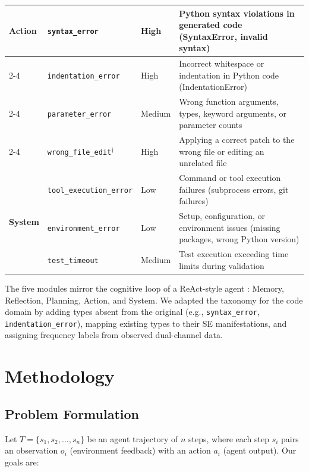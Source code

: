 \documentclass{ieeeaccess}
\begin{document}
\begin{table}[ht!]
\begin{tabularx}{\textwidth}{|p{}|p{}|p{}|X|}
\multirow{4}{*}{\textbf{Action}}
    & \texttt{syntax\_error}               & High & Python syntax violations in generated code (SyntaxError, invalid syntax) \\
\cline{2-4}
    & \texttt{indentation\_\allowbreak{}error}          & High & Incorrect whitespace or indentation in Python code (IndentationError) \\
\cline{2-4}
    & \texttt{parameter\_error}            & Medium & Wrong function arguments, types, keyword arguments, or parameter counts \\
\cline{2-4}
    & \texttt{wrong\_file\_edit}$^\dagger$ & High & Applying a correct patch to the wrong file or editing an unrelated file \\
\hline

\multirow{3}{*}{\textbf{System}}
    & \texttt{tool\_execution\_\allowbreak{}error}      & Low    & Command or tool execution failures (subprocess errors, git failures) \\
\cline{2-4}
    & \texttt{environment\_\allowbreak{}error}          & Low    & Setup, configuration, or environment issues (missing packages, wrong Python version) \\
\cline{2-4}
    & \texttt{test\_timeout}               & Medium & Test execution exceeding time limits during validation \\
\hline
\end{tabularx}
\end{table}

The five modules mirror the cognitive loop of a ReAct-style agent \cite{b2}: Memory, Reflection, Planning, Action, and System. We adapted the taxonomy for the code domain by adding types absent from the original (e.g., \texttt{syntax\_error}, \texttt{indentation\_error}), mapping existing types to their SE manifestations, and assigning frequency labels from observed dual-channel data.

\section{Methodology}
\label{sec:methodology}

\subsection{Problem Formulation}

Let $T = \{s_1, s_2, \ldots, s_n\}$ be an agent trajectory of $n$ steps, where each step $s_i$ pairs an observation $o_i$ (environment feedback) with an action $a_i$ (agent output). Our goals are:
\end{document}
